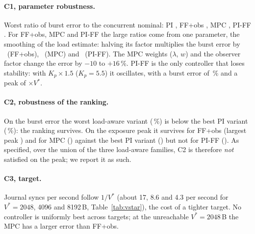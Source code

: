 \documentclass[smallextended]{svjour3}
\begin{document}
\paragraph{C1, parameter robustness.}
Worst ratio of burst error to the concurrent nominal: PI \SensWorstPIT, FF+obs \SensWorstFFO, MPC \SensWorstMPCP, PI-FF \SensWorstPIFF. For FF+obs, MPC and PI-FF the large ratios come from one parameter, the smoothing of the load estimate:
halving its factor multiplies the burst error by \SensSmoothFFO\ (FF+obs), \SensSmoothMPCP\ (MPC) and \SensSmoothPIFF\ (PI-FF). The MPC weights ($\lambda$, $w$) and the observer factor change the error by $-10$ to $+16$\,\%.
PI-FF is the only controller that loses stability: with $K_p\times1.5$ ($K_p=5.5$) it oscillates, with a burst error of \SensPIFFkpErr\,\% and a peak of \SensPIFFkpPeak$\times V^*$.
\paragraph{C2, robustness of the ranking.}
On the burst error the worst load-aware variant (\SensWorstAwareErr\,\%) is below the best PI variant (\SensBestPIErr\,\%): the ranking survives. On the exposure peak it survives for FF+obs (largest peak \SensMaxPeakFFO) and for MPC (\SensMaxPeakMPCP)
against the best PI variant (\SensMinPeakPIT) but not for PI-FF (\SensPIFFkpPeak). As specified, over the union of the three load-aware families, C2 is therefore \emph{not} satisfied on the peak; we report it as such.
\paragraph{C3, target.}
Journal syncs per second follow $1/V^*$ (about 17, 8.6 and 4.3 per second for $V^*=2048$, 4096 and 8192\,B, Table~\ref{tab:vstar}), the cost of a tighter target. No controller is uniformly best across targets;
at the unreachable $V^*=2048$\,B the MPC has a larger error than FF+obs.


\end{document}
